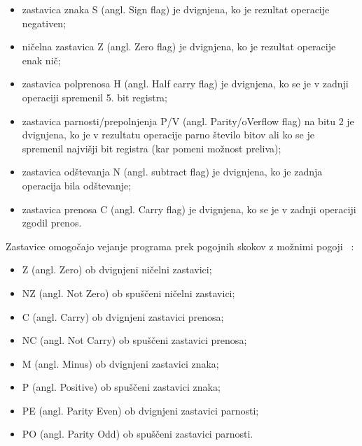 \documentclass[a4paper, 12pt, openright]{book}
\begin{document}
    \begin{itemize}
        \item zastavica znaka S (angl. Sign flag) je dvignjena, ko je rezultat operacije
            negativen;

        \item ničelna zastavica Z (angl. Zero flag) je dvignjena, ko je rezultat operacije
            enak nič;

        \item zastavica polprenosa H (angl. Half carry flag) je dvignjena, ko se je
            v zadnji operaciji spremenil 5. bit registra;

        \item zastavica parnosti/prepolnjenja P/V (angl. Parity/oVerflow flag)
            na bitu 2 je dvignjena, ko je v rezultatu operacije parno število bitov
            ali ko se je spremenil najvišji bit registra (kar pomeni možnost
            preliva);

        \item zastavica odštevanja N (angl. subtract flag) je dvignjena, ko je zadnja
            operacija bila odštevanje;

        \item zastavica prenosa C (angl. Carry flag) je dvignjena, ko se je v zadnji
            operaciji zgodil prenos.
    \end{itemize}

    Zastavice omogočajo vejanje programa prek pogojnih skokov z možnimi pogoji ~\cite{strojnijezikzaprocesorz80}:

    \begin{itemize}
        \item Z (angl. Zero) ob dvignjeni ničelni zastavici;

        \item NZ (angl. Not Zero) ob spuščeni ničelni zastavici;

        \item C (angl. Carry) ob dvignjeni zastavici prenosa;

        \item NC (angl. Not Carry) ob spuščeni zastavici prenosa;

        \item M (angl. Minus) ob dvignjeni zastavici znaka;

        \item P (angl. Positive) ob spuščeni zastavici znaka;

        \item PE (angl. Parity Even) ob dvignjeni zastavici parnosti;

        \item PO (angl. Parity Odd) ob spuščeni zastavici parnosti.
    \end{itemize}
\end{document}
